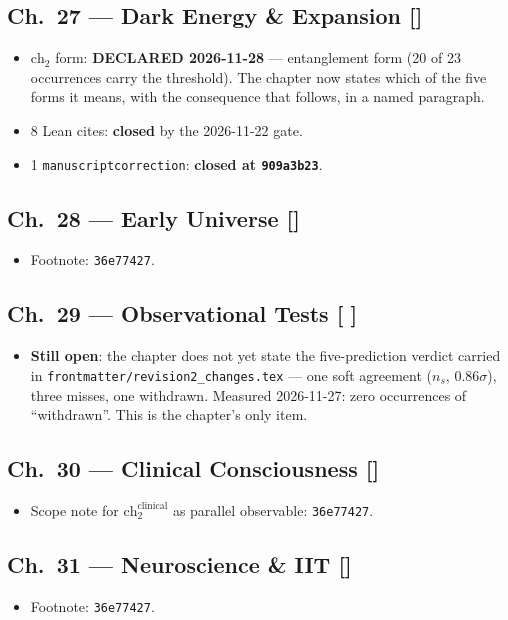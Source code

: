\subsection*{Ch.~27 --- Dark Energy \& Expansion \hfill [\checkmark]}
\begin{itemize}
\item $\mathrm{ch}_2$ form: \textbf{DECLARED 2026-11-28} --- entanglement form (20 of 23 occurrences carry the threshold). The chapter now states which of the five forms it means, with the consequence that follows, in a named paragraph.
\item 8 Lean cites: \textbf{closed} by the 2026-11-22 gate.
\item 1 \texttt{manuscriptcorrection}: \textbf{closed at \texttt{909a3b23}}.
\end{itemize}

\subsection*{Ch.~28 --- Early Universe \hfill [\checkmark]}
\begin{itemize}
\item Footnote: \texttt{36e77427}.
\end{itemize}

\subsection*{Ch.~29 --- Observational Tests \hfill [\,\,]}
\begin{itemize}
\item \textbf{Still open}: the chapter does not yet state the five-prediction
verdict carried in \texttt{frontmatter/revision2\_changes.tex} --- one soft
agreement ($n_s$, $0.86\sigma$), three misses, one withdrawn. Measured
2026-11-27: zero occurrences of ``withdrawn''. This is the chapter's only
item.
\end{itemize}

\subsection*{Ch.~30 --- Clinical Consciousness \hfill [\checkmark]}
\begin{itemize}
\item Scope note for $\mathrm{ch}_2^{\mathrm{clinical}}$ as parallel observable: \texttt{36e77427}.
\end{itemize}

\subsection*{Ch.~31 --- Neuroscience \& IIT \hfill [\checkmark]}
\begin{itemize}
\item Footnote: \texttt{36e77427}.
\end{itemize}

